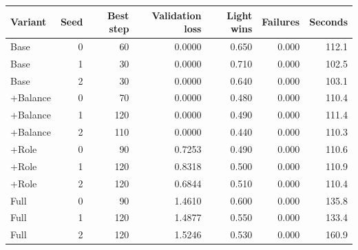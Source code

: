 \begin{tabular}{lrrrrrr}
\toprule
Variant & Seed & Best step & Validation loss & Light wins & Failures & Seconds\\
\midrule
Base & 0 & 60 & 0.0000 & 0.650 & 0.000 & 112.1\\
Base & 1 & 30 & 0.0000 & 0.710 & 0.000 & 102.5\\
Base & 2 & 30 & 0.0000 & 0.640 & 0.000 & 103.1\\
+Balance & 0 & 70 & 0.0000 & 0.480 & 0.000 & 110.4\\
+Balance & 1 & 120 & 0.0000 & 0.490 & 0.000 & 111.4\\
+Balance & 2 & 110 & 0.0000 & 0.440 & 0.000 & 110.3\\
+Role & 0 & 90 & 0.7253 & 0.490 & 0.000 & 110.6\\
+Role & 1 & 120 & 0.8318 & 0.500 & 0.000 & 110.9\\
+Role & 2 & 120 & 0.6844 & 0.510 & 0.000 & 110.4\\
Full & 0 & 90 & 1.4610 & 0.600 & 0.000 & 135.8\\
Full & 1 & 120 & 1.4877 & 0.550 & 0.000 & 133.4\\
Full & 2 & 120 & 1.5246 & 0.530 & 0.000 & 160.9\\
\bottomrule
\end{tabular}
